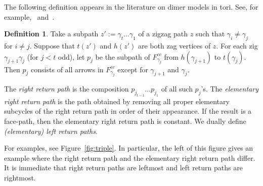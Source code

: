 \documentclass{article}
\theoremstyle{definition}
\newtheorem{defn}[thm]{Definition}
\begin{document}
    


The following definition appears in the literature on dimer models in tori.
See, for example,~\cite{XBocklandt2011} and~\cite{XBroomhead2009}.

\begin{defn}\label{defn:return-path}
	Take a subpath $z':=\gamma_t\dots\gamma_1$ of a zigzag path $z$ such that $\gamma_i\neq\gamma_j$ for $i\neq j$. 
	Suppose that $t(z')$ and $h(z')$ are both zag vertices of $z$. 
	For each zig $\gamma_{j+1}\gamma_j$ (for $j<t$ odd), let $p_j$ be the subpath of $F_{\gamma_j}^{cc}$ from $h(\gamma_{j+1})$ to $t(\gamma_j)$. Then $p_j$ consists of all arrows in $F_{\gamma_j}^{cc}$ except for $\gamma_{j+1}$ and $\gamma_j$.

	The \textit{right return path} 
	is the composition $p_{j_{t-1}}\dots p_{j_1}$ of all such $p_j$'s. The \textit{elementary right return path} is the path obtained by removing all proper elementary subcycles of the right return path in order of their appearance. If the result is a face-path, then the elementary right return path is constant.
	We dually define \textit{(elementary) left return paths}.
\end{defn}

For examples, see Figure~\ref{fig:triple}. In particular, the left of this figure gives an example where the right return path and the elementary right return path differ. It is immediate that right return paths are leftmost and left return paths are rightmost.
\end{document}
